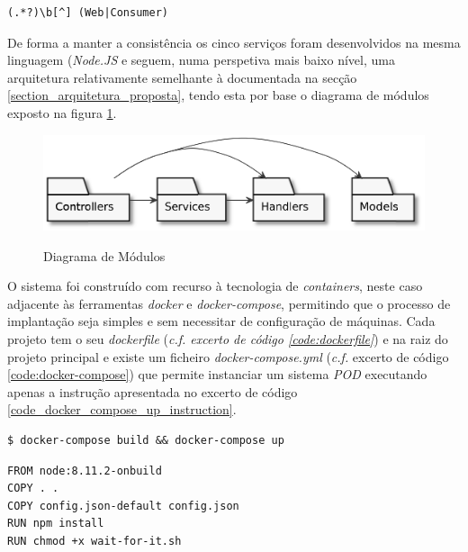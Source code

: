 \begin{lstlisting}[caption={Expressão regular}, label={code_regex_projects_name}]
(.*?)\b[^] (Web|Consumer)
\end{lstlisting}

De forma a manter a consistência os cinco serviços foram desenvolvidos na mesma linguagem (\emph{Node.JS} e seguem, numa perspetiva mais baixo nível, uma arquitetura relativamente semelhante à documentada na secção \ref{section_arquitetura_proposta}, tendo esta por base o diagrama de módulos exposto na figura \ref{implementation_module_diagram}.

\begin{figure}[H]
    \begin{center}
    \includegraphics[width=0.6 \textwidth]{figures/module_diagram.eps}
    \label{implementation_module_diagram}
    \caption{Diagrama de Módulos}
    \end{center}
\end{figure}

O sistema foi construído com recurso à tecnologia de \emph{containers}, neste caso adjacente às ferramentas \emph{docker} e \emph{docker-compose}, permitindo que o processo de implantação seja simples e sem necessitar de configuração de máquinas. Cada projeto tem o seu \emph{dockerfile} (\emph{\emph{c.f.} excerto de código \ref{code:dockerfile}}) e na raiz do projeto principal e existe um ficheiro \emph{docker-compose.yml} (\emph{c.f.} excerto de código \ref{code:docker-compose}) que permite instanciar um sistema \emph{\acrshort{POD}} executando apenas a instrução apresentada no excerto de código \ref{code_docker_compose_up_instruction}.

\begin{lstlisting}[caption={Instrução para instanciar \emph{Solid}}, label={code_docker_compose_up_instruction}]
$ docker-compose build && docker-compose up
\end{lstlisting}

\begin{lstlisting}[language=docker,caption={Ficheiro Dockerfile},breaklines=true,label={code:dockerfile}]
FROM node:8.11.2-onbuild
COPY . .
COPY config.json-default config.json
RUN npm install
RUN chmod +x wait-for-it.sh
\end{lstlisting}

